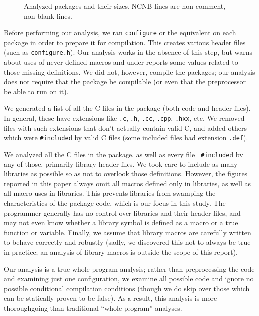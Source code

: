 \documentclass[10pt]{article}
\newcommand{\file}[1]{\texttt{#1}}
\begin{document}
\begin{figure}
\centering
{%
  \small
  \setlength{\tabcolsep}{.25em}
  
}
\caption{Analyzed packages and their sizes.  NCNB lines are non-comment,
  non-blank lines.}
\label{fig:packages}
\end{figure}

Before performing our analysis, we ran {\tt configure} or the equivalent on
each package in order to prepare it for compilation.  This creates various
header files (such as \file{configure.h}).  Our analysis works in the
absence of this step, but warns about uses of never-defined macros and
under-reports some values related to those missing definitions.  We did
not, however, compile the packages; our analysis does not require that the
package be compilable (or even that the preprocessor be able to run on it).

We generated a list of all the C files in the package (both code and header
files).  In general, these have extensions like \file{.c}, \file{.h},
\file{.cc}, \file{.cpp}, \file{.hxx}, etc.  We removed files with such
extensions that don't actually contain valid C, and added others which were
{\tt \#included} by valid C files (some included files had extension
\file{.def}).

We analyzed all the C files in the package, as well as every file {\tt
\#include}d by any of those, primarily library header files.  We
took care to include as many libraries as possible so as not to overlook
those definitions.  However, the figures reported in this paper always omit
all macros defined only in libraries, as well as all macro uses in
libraries.  This prevents libraries from 
swamping the characteristics of the package code, which is our focus in
this study.  The programmer generally has no control over libraries and
their header files, and may not even know whether a library symbol is
defined as a macro or a true function or variable.  Finally, we assume that
library macros are carefully written to behave correctly and robustly
(sadly, we discovered this not to always be true in practice; an
analysis of library macros is outside the scope of this report).

Our analysis is a true whole-program analysis; rather than preprocessing the
code and examining just one configuration, we examine all possible code and
ignore no possible  conditional compilation conditions (though we do skip
over those which can be statically proven to be false).   As a result, this
analysis is more thoroughgoing than traditional ``whole-program'' analyses.
\end{document}
